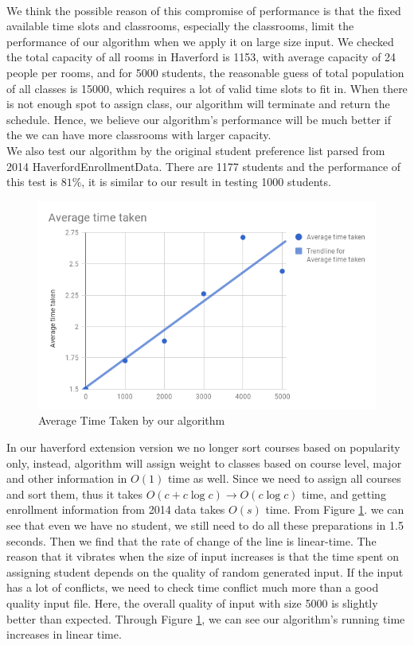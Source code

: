 \documentclass[11pt, oneside]{article}   	%
\begin{document}
\\We think the possible reason of this compromise of performance is that the fixed available time slots and classrooms, especially the classrooms, limit the performance of our algorithm when we apply it on large size input. We checked the total capacity of all rooms in Haverford is 1153, with average capacity of 24 people per rooms, and for 5000 students, the reasonable guess of total population of all classes is 15000, which requires a lot of valid time slots to fit in. When there is not enough spot to assign class, our algorithm will terminate and return the schedule. Hence, we believe our algorithm's performance will be much better if the we can have more classrooms with larger capacity. 
\\We also test our algorithm by the original student preference list parsed from 2014 HaverfordEnrollmentData. There are 1177 students and the performance of this test is $81\%$, it is similar to our result in testing 1000 students. 
\begin{figure}[H]
\centering
\includegraphics[scale =.6]{chart}
\caption{Average Time Taken by our algorithm}
\label{timechart}
\end{figure}
In our haverford extension version we no longer sort courses based on popularity only, instead, algorithm will assign weight to classes based on course level, major and other information in $O(1)$ time as well. Since we need to assign all courses and sort them, thus it takes $O(c+c\log c) \to O(c\log c)$ time, and getting enrollment information from 2014 data takes $O(s)$ time. From Figure \ref{timechart}. we can see that even we have no student, we still need to do all these preparations in 1.5 seconds. Then we find that the rate of change of the line is linear-time. The reason that it vibrates when the size of input increases is that the time spent on assigning student depends on the quality of random generated input. If the input has a lot of conflicts,  we need to check time conflict much more than a good quality input file. Here, the overall quality of input with size 5000 is slightly better than expected. Through Figure \ref{timechart}, we can see our algorithm's running time increases in linear time.
\end{document}
